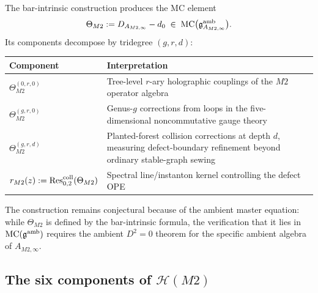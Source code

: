 \begin{construction}
The bar-intrinsic construction produces the MC element
\begin{equation}%
\Theta_{M2} := D_{A_{M2,\infty}} - d_0
\;\in\;
\MC\bigl(\mathfrak{g}^{\mathrm{amb}}_{A_{M2,\infty}}\bigr).
\end{equation}
Its components decompose by tridegree $(g,r,d)$:
\begin{center}
\renewcommand{\arraystretch}{1.25}
\small
\begin{tabular}{lp{8.5cm}}
\textbf{Component} & \textbf{Interpretation} \\
\hline
$\Theta_{M2}^{(0,r,0)}$ & Tree-level $r$-ary holographic couplings
 of the $M2$ operator algebra \\
$\Theta_{M2}^{(g,r,0)}$ & Genus-$g$ corrections from loops in the
 five-dimensional noncommutative gauge theory \\
$\Theta_{M2}^{(g,r,d)}$ & Planted-forest collision corrections at
 depth $d$, measuring defect-boundary refinement beyond ordinary
 stable-graph sewing \\
$r_{M2}(z) := \operatorname{Res}^{\mathrm{coll}}_{0,2}(\Theta_{M2})$ & Spectral
 line/instanton kernel controlling the defect OPE
\end{tabular}
\end{center}
The construction remains conjectural because of the ambient master equation:
while
$\Theta_{M2}$ is defined by the bar-intrinsic formula, the
verification that it lies in $\mathrm{MC}(\mathfrak{g}^{\mathrm{amb}})$
requires the ambient $D^2 = 0$ theorem for the specific ambient
algebra of $A_{M2,\infty}$.
\end{construction}


\subsection{The six components of $\mathcal{H}(M2)$}

